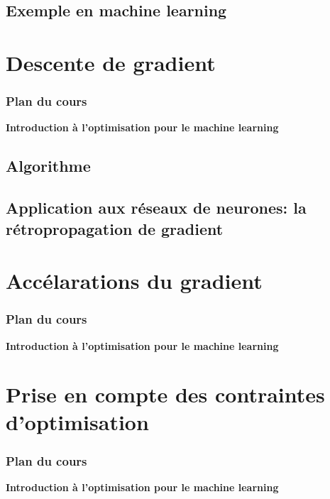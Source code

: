 \documentclass[12pt]{beamer}
\begin{document}
\subsection{Exemple en machine learning}

\section{Descente de gradient}
\begin{frame}%
\frametitle{Plan du cours} 
\begin{center} \textbf{Introduction à l'optimisation pour le machine learning} \end{center}
\tableofcontents[currentsection]
\end{frame}
\subsection{Algorithme}
\subsection{Application aux réseaux de neurones: la rétropropagation de gradient}

\section{Accélarations du gradient}
\begin{frame}%
\frametitle{Plan du cours} 
\begin{center} \textbf{Introduction à l'optimisation pour le machine learning} \end{center}
\tableofcontents[currentsection]
\end{frame}

\section{Prise en compte des contraintes d'optimisation}
\begin{frame}%
\frametitle{Plan du cours} 
\begin{center} \textbf{Introduction à l'optimisation pour le machine learning} \end{center}
\tableofcontents[currentsection]
\end{frame}
\end{document}
